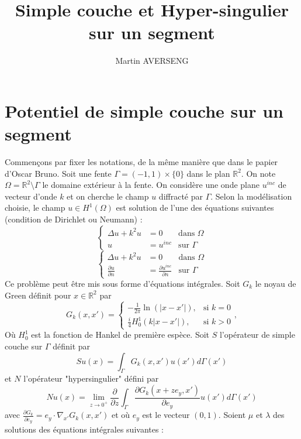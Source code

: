 \documentclass[11pt,a4paper]{article}
\author{Martin AVERSENG}
\title{Simple couche et Hyper-singulier sur un segment}
\begin{document}
\maketitle	

\section{Potentiel de simple couche sur un segment}

Commençons par fixer les notations, de la même manière que dans le papier d'Oscar Bruno. 
Soit une fente $\Gamma = (-1,1)\times \{0\}$ dans le plan $\mathbb{R}^2$. On note $\Omega = \mathbb{R}^2 \setminus \Gamma$ le domaine extérieur à la fente. On considère une onde plane $u^{inc}$ de vecteur d'onde $k$ et on cherche le champ $u$ diffracté par  $\Gamma$. Selon la modélisation choisie, le champ $u \in H^1(\Omega)$ est solution de l'une des équations suivantes (condition de Dirichlet ou Neumann) : 
\begin{equation} \left\{\begin{array}{rll}
\Delta u + k^2 u &= 0 & \text{dans $\Omega$}\\
u &= u^{inc} & \text{sur } \Gamma
\end{array}\right.
\label{ProblemeDeDirichlet}
\end{equation}
\begin{equation} \left\{\begin{array}{rll}
\Delta u + k^2 u &= 0 & \text{dans $\Omega$}\\
\frac{\partial u}{\partial n} &= \frac{\partial u^{inc}}{\partial n} & \text{sur } \Gamma
\end{array}\right.
\label{ProblemeDeNeumann}
\end{equation}
Ce problème peut être mis sous forme d'équations intégrales. Soit $G_k$ le noyau de Green définit pour $x \in \mathbb{R}^2$ par
\[G_k(x,x') = \left\{\begin{array}{cl} 
-\frac{1}{2\pi}\ln(|x-x'|), & \text{si $k=0$}\\
 \frac{i}{4}H_0^1(k|x-x'|),& \text{si $k>0$} 
\end{array}\right.,\]
Où $H^1_0$ est la fonction de Hankel de première espèce. 
Soit $S$ l'opérateur de simple couche sur $\Gamma$ définit par
	\[Su(x) = \int_\Gamma G_k(x,x')u(x')d\Gamma(x')\]
et $N$ l'opérateur "hypersingulier" défini par 
\[Nu(x) = \lim_{z \to 0^+} \dfrac{\partial}{\partial z}\int_\Gamma \dfrac{\partial G_k(x + z e_y, x')}{\partial e_y}u(x')d\Gamma(x')\]
avec $\frac{\partial G_k}{\partial e_y} = e_y \cdot \nabla_{x'} G_k(x,x')$ et où $e_y$ est le vecteur $(0,1)$. Soient $\mu$ et $\lambda$ des solutions des équations intégrales suivantes : 
\end{document}
